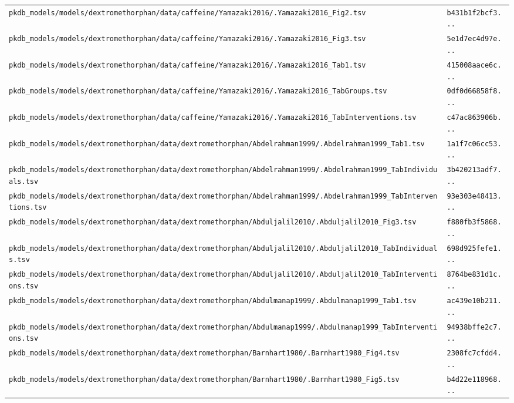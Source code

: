 \begin{longtable}{ll}
\texttt{pkdb\_models/models/dextromethorphan/data/caffeine/Yamazaki2016/.Yamazaki2016\_Fig2.tsv} & \texttt{b431b1f2bcf3...} \\
\texttt{pkdb\_models/models/dextromethorphan/data/caffeine/Yamazaki2016/.Yamazaki2016\_Fig3.tsv} & \texttt{5e1d7ec4d97e...} \\
\texttt{pkdb\_models/models/dextromethorphan/data/caffeine/Yamazaki2016/.Yamazaki2016\_Tab1.tsv} & \texttt{415008aace6c...} \\
\texttt{pkdb\_models/models/dextromethorphan/data/caffeine/Yamazaki2016/.Yamazaki2016\_TabGroups.tsv} & \texttt{0df0d66858f8...} \\
\texttt{pkdb\_models/models/dextromethorphan/data/caffeine/Yamazaki2016/.Yamazaki2016\_TabInterventions.tsv} & \texttt{c47ac863906b...} \\
\texttt{pkdb\_models/models/dextromethorphan/data/dextromethorphan/Abdelrahman1999/.Abdelrahman1999\_Tab1.tsv} & \texttt{1a1f7c06cc53...} \\
\texttt{pkdb\_models/models/dextromethorphan/data/dextromethorphan/Abdelrahman1999/.Abdelrahman1999\_TabIndividuals.tsv} & \texttt{3b420213adf7...} \\
\texttt{pkdb\_models/models/dextromethorphan/data/dextromethorphan/Abdelrahman1999/.Abdelrahman1999\_TabInterventions.tsv} & \texttt{93e303e48413...} \\
\texttt{pkdb\_models/models/dextromethorphan/data/dextromethorphan/Abduljalil2010/.Abduljalil2010\_Fig3.tsv} & \texttt{f880fb3f5868...} \\
\texttt{pkdb\_models/models/dextromethorphan/data/dextromethorphan/Abduljalil2010/.Abduljalil2010\_TabIndividuals.tsv} & \texttt{698d925fefe1...} \\
\texttt{pkdb\_models/models/dextromethorphan/data/dextromethorphan/Abduljalil2010/.Abduljalil2010\_TabInterventions.tsv} & \texttt{8764be831d1c...} \\
\texttt{pkdb\_models/models/dextromethorphan/data/dextromethorphan/Abdulmanap1999/.Abdulmanap1999\_Tab1.tsv} & \texttt{ac439e10b211...} \\
\texttt{pkdb\_models/models/dextromethorphan/data/dextromethorphan/Abdulmanap1999/.Abdulmanap1999\_TabInterventions.tsv} & \texttt{94938bffe2c7...} \\
\texttt{pkdb\_models/models/dextromethorphan/data/dextromethorphan/Barnhart1980/.Barnhart1980\_Fig4.tsv} & \texttt{2308fc7cfdd4...} \\
\texttt{pkdb\_models/models/dextromethorphan/data/dextromethorphan/Barnhart1980/.Barnhart1980\_Fig5.tsv} & \texttt{b4d22e118968...} \\

\end{longtable}
